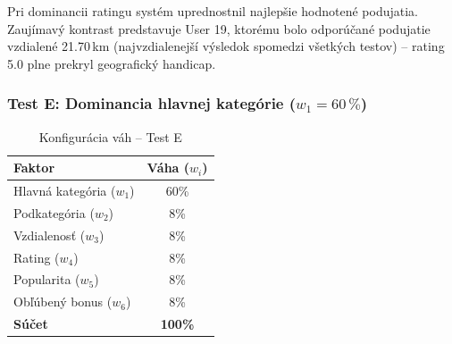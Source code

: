 Pri dominancii ratingu systém uprednostnil najlepšie hodnotené podujatia. Zaujímavý kontrast predstavuje User 19, ktorému bolo odporúčané podujatie vzdialené 21.70\,km (najvzdialenejší výsledok spomedzi všetkých testov) – rating 5.0 plne prekryl geografický handicap.

\subsubsection{Test E: Dominancia hlavnej kategórie ($w_1 = 60\,\%$)}

\begin{table}[H]
\centering
\caption{Konfigurácia váh – Test E}
\label{tab:vahy_testE}
\begin{tabular}{|l|c|}
\hline
\textbf{Faktor} & \textbf{Váha ($w_i$)} \\ \hline
Hlavná kategória ($w_1$) & 60\% \\
Podkategória ($w_2$)     & 8\% \\
Vzdialenosť ($w_3$)      & 8\% \\
Rating ($w_4$)           & 8\% \\
Popularita ($w_5$)       & 8\% \\
Obľúbený bonus ($w_6$)   & 8\% \\ \hline
\textbf{Súčet}           & \textbf{100\%} \\ \hline
\end{tabular}
\end{table}

